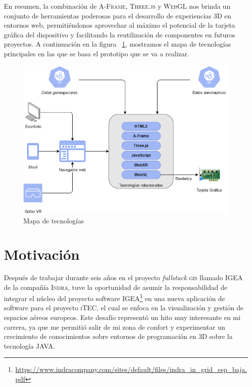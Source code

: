 \documentclass[a4paper, 11pt]{book}
\begin{document}
En resumen, la combinación de \textsc{A-Frame}, \textsc{Three.js} y \textsc{WebGL} nos brinda un conjunto de herramientas poderosas para el desarrollo de experiencias \textsc{3D} en entornos web, permitiéndonos aprovechar al máximo el potencial de la tarjeta gráfica del dispositivo y facilitando la reutilización de componentes en futuros proyectos.
A continuación en la figura ~\ref{figura:mapaTecnologias}, mostramos el mapa de tecnologías principales en las que se basa el prototipo que se va a realizar. 
 \begin{figure}[h]
    \centering
    \includegraphics[bb=0 0 564 586, width=12cm, keepaspectratio]{img/mapaFuncional.drawio.png}
    \caption{Mapa de tecnologías}
    \label{figura:mapaTecnologias}
 \end{figure}
\clearpage
\section{Motivación}
\label{sec:motivación}

Después de trabajar durante seis años en el proyecto \emph{fullstack} \textsc{\gls{gis}} llamado \textsc{IGEA} de la compañía \textsc{Indra}, tuve la oportunidad de asumir la responsabilidad de integrar el núcleo del proyecto software \textsc{IGEA}\footnote{\url{https://www.indracompany.com/sites/default/files/indra_in_grid_esp_baja.pdf}} en una nueva aplicación de software para el proyecto \textsc{iTEC}, el cual se enfoca en la visualización y gestión de espacios aéreos europeos. Este desafío representó un hito muy interesante en mi carrera, ya que me permitió salir de mi zona de confort y experimentar un crecimiento de conocimientos sobre entornos de programación en 3D sobre la tecnología \textsc{JAVA}.
\end{document}
